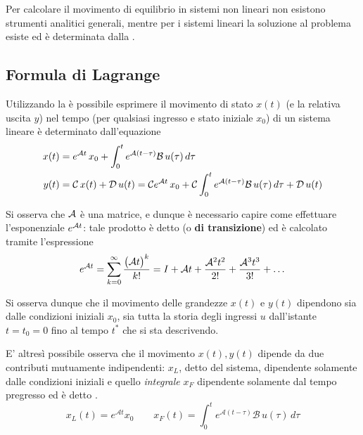  	Per calcolare il movimento di equilibrio in sistemi non lineari non esistono strumenti analitici generali, mentre per i sistemi lineari la soluzione al problema esiste ed è determinata dalla .
 	
 	\subsection{Formula di Lagrange}
 		
 		Utilizzando la  è possibile esprimere il movimento di stato $x(t)$ (e la relativa uscita $y$) nel tempo (per qualsiasi ingresso e stato iniziale $x_0$) di un sistema lineare è determinato dall'equazione
 		\begin{equation}
 		\begin{split}
 			x(t) & = e^{\mathcal A t} \, x_0 + \int_0^t e^{\mathcal A(t-\tau)} \mathcal B\, u(\tau)\, d\tau \\
 			y(t) & = \mathcal C \, x(t) + \mathcal D \,u(t) = \mathcal C e^{\mathcal A t} \, x_0 + \mathcal C \int_0^t e^{\mathcal A(t-\tau)} \mathcal B\, u(\tau)\, d\tau + \mathcal D \,u(t)
 		\end{split}
 		\end{equation}
 		
 		Si osserva che $\mathcal A$ è una matrice, e dunque è necessario capire come effettuare l'esponenziale $e^{\mathcal A t}$: tale prodotto è detto  (o \textbf{di transizione}) ed è calcolato tramite l'espressione
 		\[ e^{\mathcal A t} = \sum_{k=0}^\infty \frac{\big(\mathcal A t\big)^k}{k!} = I + \mathcal A t  + \frac{\mathcal A^2 t^2}{2!} + \frac{\mathcal A^3 t^3}{3!} + \dots \]
 		
 		\vspace{3mm}
	 	
	 	
	 	Si osserva dunque che il movimento delle grandezze $x(t)$ e $y(t)$ dipendono sia dalle condizioni iniziali $x_0$, sia tutta la 	storia degli ingressi $u$ dall'istante $t=t_0 = 0$ fino al tempo $t^*$ che si sta descrivendo.
	 	
	 	E' altresì possibile osserva che il movimento $x(t),y(t)$ dipende da due contributi mutuamente indipendenti: $x_L$, detto  del sistema, dipendente solamente dalle condizioni iniziali e quello \textit{integrale} $x_F$ dipendente solamente dal tempo pregresso ed è detto .
 		\[ x_L(t) = e^{\mathcal A t} x_0 \qquad x_F(t) = \int_0^t e^{\mathcal A (t-\tau)} \mathcal B \, u(\tau)\, d\tau \]
 	
